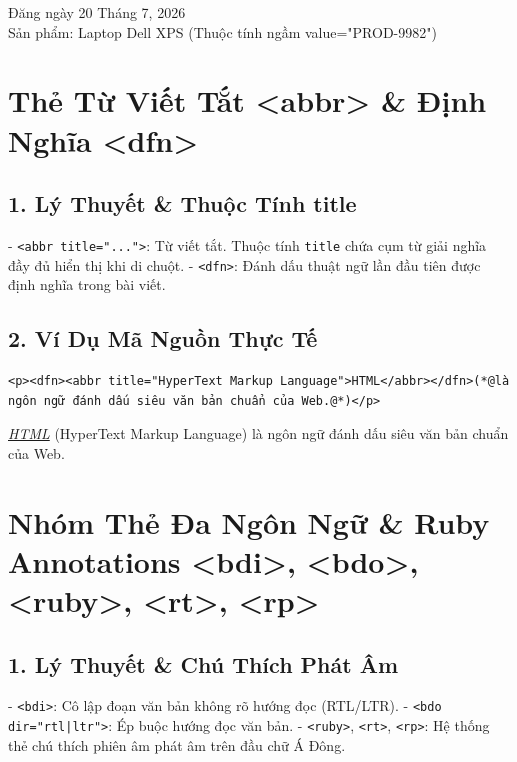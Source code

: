 \documentclass[11pt,oneside]{book}
\newcommand{\codeinline}[1]{\textcolor{accentOrange}{\texttt{#1}}}
\begin{document}
\begin{browserWindow}
\sffamily\small
Đăng ngày 20 Tháng 7, 2026\\[2pt]
Sản phẩm: Laptop Dell XPS \textcolor{gray!70}{\small(Thuộc tính ngầm value="PROD-9982")}
\end{browserWindow}

\section{Thẻ Từ Viết Tắt <abbr> \& Định Nghĩa <dfn>}
\subsection{1. Lý Thuyết \& Thuộc Tính title}
- \codeinline{<abbr title="...">}: Từ viết tắt. Thuộc tính \codeinline{title} chứa cụm từ giải nghĩa đầy đủ hiển thị khi di chuột.
- \codeinline{<dfn>}: Đánh dấu thuật ngữ lần đầu tiên được định nghĩa trong bài viết.

\subsection{2. Ví Dụ Mã Nguồn Thực Tế}
\begin{codeWindow}
\begin{lstlisting}[language=HTML5]
<p><dfn><abbr title="HyperText Markup Language">HTML</abbr></dfn>(*@là ngôn ngữ đánh dấu siêu văn bản chuẩn của Web.@*)</p>
\end{lstlisting}
\end{codeWindow}

\begin{browserWindow}
\sffamily\small
\textit{\underline{HTML}} (HyperText Markup Language) là ngôn ngữ đánh dấu siêu văn bản chuẩn của Web.
\end{browserWindow}

\section{Nhóm Thẻ Đa Ngôn Ngữ \& Ruby Annotations <bdi>, <bdo>, <ruby>, <rt>, <rp>}
\subsection{1. Lý Thuyết \& Chú Thích Phát Âm}
- \codeinline{<bdi>}: Cô lập đoạn văn bản không rõ hướng đọc (RTL/LTR).
- \codeinline{<bdo dir="rtl|ltr">}: Ép buộc hướng đọc văn bản.
- \codeinline{<ruby>}, \codeinline{<rt>}, \codeinline{<rp>}: Hệ thống thẻ chú thích phiên âm phát âm trên đầu chữ Á Đông.
\end{document}
